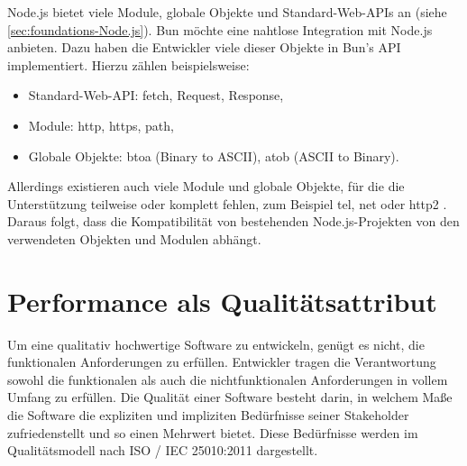 \noindent
Node.js bietet viele Module, globale Objekte und Standard-Web-APIs an (siehe \autoref{sec:foundations-Node.js}). Bun möchte eine nahtlose Integration mit Node.js anbieten. Dazu haben die Entwickler viele dieser Objekte in Bun's API implementiert. Hierzu zählen beispielsweise:
\begin{itemize}
	\item Standard-Web-API: \glq fetch\grq{}, \glq Request\grq{}, \glq Response\grq{},
	\item Module: \glq http\grq{}, \glq https\grq{}, \glq path\grq{},
	\item Globale Objekte: \glq btoa\grq{} (Binary to ASCII), \glq atob\grq{} (ASCII to Binary).\cite{OvenSh.2023c}
\end{itemize} 

\noindent
Allerdings existieren auch viele Module und globale Objekte, für die die Unterstützung teilweise oder komplett fehlen, zum Beispiel \glq tel\grq{}, \glq net\grq{} oder \glq http2\grq{} \cite{OvenSh.2023c}. Daraus folgt, dass die Kompatibilität von bestehenden Node.js-Projekten von den verwendeten Objekten und Modulen abhängt.

\section{Performance als Qualitätsattribut} \label{sec:foundations-Performance}
Um eine qualitativ hochwertige Software zu entwickeln, genügt es nicht, die funktionalen Anforderungen zu erfüllen. Entwickler tragen die Verantwortung sowohl die funktionalen als auch die nichtfunktionalen Anforderungen in vollem Umfang zu erfüllen. Die Qualität einer Software besteht darin, in welchem Maße die Software die expliziten und impliziten Bedürfnisse seiner Stakeholder zufriedenstellt und so einen Mehrwert bietet. Diese Bedürfnisse werden im Qualitätsmodell nach ISO / IEC 25010:2011 dargestellt.\cite{.2022}\\

